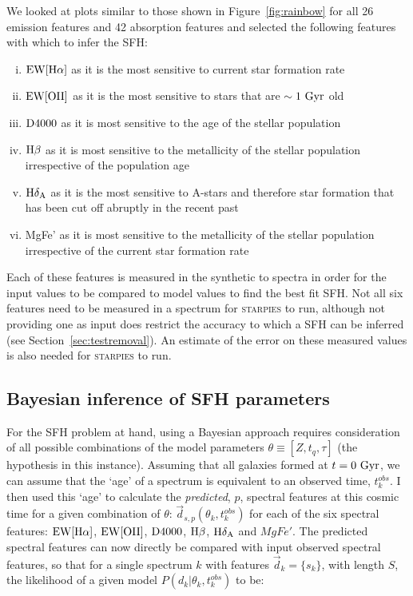 \documentclass[useAMS,usenatbib]{mn2e}
\begin{document}
We looked at plots similar to those shown in Figure~\ref{fig:rainbow} for all 26 emission features and 42 absorption features and selected the following features with which to infer the SFH:
\begin{enumerate}[(i)]
\item $\rm{EW}[H\alpha]$ as it is the most sensitive to current star formation rate

\item $\rm{EW}[OII]$ as it is the most sensitive to stars that are $\sim 1~\rm{Gyr}$ old

\item $\rm{D}4000$ as it is most sensitive to the age of the stellar population

\item $\rm{H}\beta$ as it is most sensitive to the metallicity of the stellar population irrespective of the population age

\item $\rm{H}\delta_A$ as it is the most sensitive to A-stars and therefore star formation that has been cut off abruptly in the recent past

\item MgFe' as it is most sensitive to the metallicity of the stellar population irrespective of the current star formation rate
\end{enumerate}

Each of these features is measured in the synthetic to spectra in order for the input values to be compared to model values to find the best fit SFH. Not all six features need to be measured in a spectrum for \textsc{starpies} to run, although not providing one as input does restrict the accuracy to which a SFH can be inferred (see Section~\ref{sec:testremoval}). An estimate of the error on these measured values is also needed for \textsc{starpies} to run. 


\subsection{Bayesian inference of SFH parameters}\label{sec:emcee}

For the SFH problem at hand, using a Bayesian approach requires consideration of all possible combinations of the model parameters $\theta \equiv [Z, t_{q}, \tau]$ (the hypothesis in this instance). Assuming that all galaxies formed at $t=0~\rm{Gyr}$, we can assume that the `age' of a spectrum is equivalent to an observed time, $t^{obs}_{k}$. I then used this  `age' to calculate the \emph{predicted}, $p$, spectral features at this cosmic time for a given combination of $\theta$: $\vec{d}_{s,p}(\theta_k, t^{obs}_{k})$ for each of the six spectral features: $\rm{EW}[H\alpha]$, $\rm{EW}[OII]$, $\rm{D}4000$, $\rm{H}\beta$, $\rm{H}\delta_A$ and $MgFe'$. The predicted spectral features can now directly be compared with input observed spectral features, so that for a single spectrum $k$ with features $\vec{d}_{k} = \{s_k\}$, with length $S$, the likelihood of a given model $P(d_{k}|\theta_k, t^{obs}_{k})$ to be:
\end{document}
